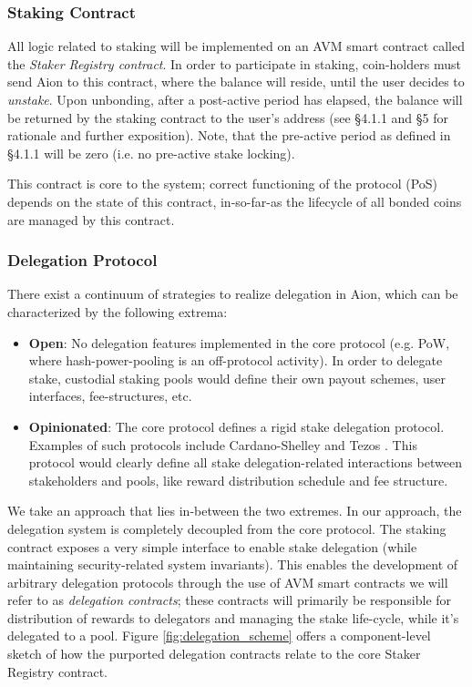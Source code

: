\subsubsection{Staking Contract}
All logic related to staking will be implemented on an AVM smart contract called the \textit{Staker Registry contract}. In order to participate in staking, coin-holders must send Aion to this contract, where the balance will reside, until the user decides to \textit{unstake}. Upon unbonding, after a post-active period has elapsed, the balance will be returned by the staking contract to the user's address (see \cite{WZS19} \S4.1.1 and \S5 for rationale and further exposition). Note, that the pre-active period as defined in \cite{WZS19} \S4.1.1 will be zero (i.e. no pre-active stake locking).  

This contract is core to the system; correct functioning of the protocol (PoS) depends on the state of this contract, in-so-far-as the lifecycle of all bonded coins are managed by this contract. 

\subsubsection{Delegation Protocol}
There exist a continuum of strategies to realize delegation in Aion, which can be characterized by the following extrema:
\begin{itemize}
    \item \textbf{Open}: No delegation features implemented in the core protocol (e.g. PoW, where hash-power-pooling is an off-protocol activity). In order to delegate stake, custodial staking pools would define their own payout schemes, user interfaces, fee-structures, etc. 
    \item \textbf{Opinionated}: The core protocol defines a rigid stake delegation protocol. Examples of such protocols include Cardano-Shelley \cite{KBC19} and Tezos \cite{Goo14}. This protocol would clearly define all stake delegation-related interactions between stakeholders and pools, like reward distribution schedule and fee structure.   
\end{itemize}

We take an approach that lies in-between the two extremes. In our approach, the delegation system is completely decoupled from the core protocol. The staking contract exposes a very simple interface to enable stake delegation (while maintaining security-related system invariants). This enables the development of arbitrary delegation protocols through the use of AVM smart contracts we will refer to as \textit{delegation contracts}; these contracts will primarily be responsible for distribution of rewards to delegators and managing the stake life-cycle, while it's delegated to a pool. Figure \ref{fig:delegation_scheme} offers a component-level sketch of how the purported delegation contracts relate to the core Staker Registry contract. 

